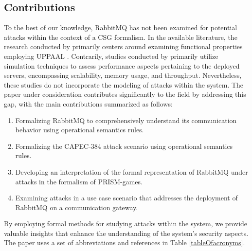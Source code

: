 \subsection{Contributions} 
To the best of our knowledge, RabbitMQ has not been examined for potential attacks within the context of a CSG formalism.  In the available literature, the research conducted by \cite{Li2020} primarily centers around examining functional properties employing UPPAAL \cite{behrmann2006uppaal}. Contrarily, studies conducted by \cite{Ionescu2015,Hong2018,Bagaskara2020,Rostanski2014}  primarily utilize simulation techniques to assess performance aspects pertaining to the deployed servers, encompassing scalability, memory usage, and throughput. Nevertheless, these studies do not incorporate the modeling of attacks within the system. The paper under consideration contributes significantly to the field by addressing this gap, with the main contributions summarized as follows:

\begin{enumerate}
    \item Formalizing RabbitMQ to comprehensively understand its communication  behavior using operational semantics rules.

    \item Formalizing the CAPEC-384 attack scenario using operational semantics rules.
    
    \item Developing an interpretation of the formal representation of RabbitMQ under attacks in the formalism of PRISM-games.
    
    \item Examining attacks in a use case scenario that addresses the deployment of RabbitMQ on a communication gateway.

    
\end{enumerate}

By employing formal methods for studying attacks within the system, we provide valuable insights that enhance the understanding of the system's security aspects. The paper uses a set of abbreviations and references in Table \ref{tableOfacronyms}.




